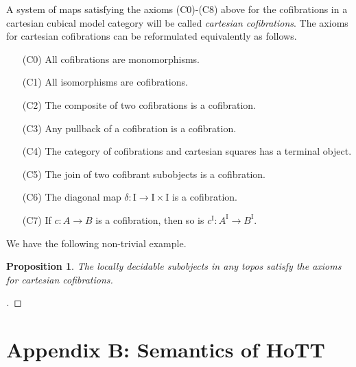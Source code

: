 \documentclass[12pt]{article}
\newcommand{\ednote}[1]{[\textit{\color{red}{#1}}]} %
\newcommand{\ra}{\ensuremath{\rightarrow}}
\renewcommand{\to}{\ensuremath{\rightarrow}}
\newcommand{\I}{\ensuremath{\mathrm{I}}}
\newtheorem{proposition}[theorem]{Proposition}
\theoremstyle{remark}
\theoremstyle{definition}
\begin{document}
A system of maps satisfying the axioms (C0)-(C8) above for the cofibrations in a cartesian cubical model category will be called \emph{cartesian cofibrations}. The axioms for cartesian cofibrations can be reformulated equivalently as follows.
\begin{enumerate}
\item[(C0)] All cofibrations are monomorphisms.
\item[(C1)] All isomorphisms are cofibrations.
\item[(C2)] The composite of two cofibrations is a cofibration.
\item[(C3)] Any pullback of a cofibration is a cofibration.
\item[(C4)] The category of cofibrations and cartesian squares has a terminal object.
\item[(C5)] The join of two cofibrant subobjects is a cofibration.
\item[(C6)] The diagonal map $\delta : \I\ra\I\times\I$ is a cofibration.
\item[(C7)] If $c:A \to B$ is a cofibration, then so is $c^\I:A^\I \to B^\I$.
\end{enumerate}

We have the following non-trivial example.
\begin{proposition}
The locally decidable subobjects in any topos satisfy the axioms for cartesian cofibrations.
\end{proposition}
\begin{proof}
\ednote{fill in ...}
\end{proof}
%
\section*{Appendix B: Semantics of HoTT}\label{appendix:HoTT}
%


%

\end{document}
